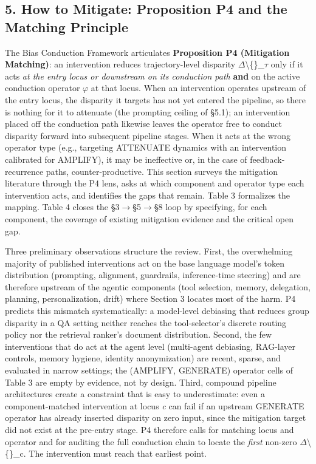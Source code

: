 \documentclass[10pt]{article}
\begin{document}
\subsection*{5. How to Mitigate: Proposition P4 and the Matching Principle}

The Bias Conduction Framework articulates \textbf{Proposition P4 (Mitigation Matching)}: an intervention reduces trajectory-level disparity $\Delta$\textbackslash\{\}\_$\tau$ only if it acts \emph{at the entry locus or downstream on its conduction path} \textbf{and} on the active conduction operator $\varphi$ at that locus. When an intervention operates upstream of the entry locus, the disparity it targets has not yet entered the pipeline, so there is nothing for it to attenuate (the prompting ceiling of \S{}5.1); an intervention placed off the conduction path likewise leaves the operator free to conduct disparity forward into subsequent pipeline stages. When it acts at the wrong operator type (e.g., targeting ATTENUATE dynamics with an intervention calibrated for AMPLIFY), it may be ineffective or, in the case of feedback-recurrence paths, counter-productive. This section surveys the mitigation literature through the P4 lens, asks at which component and operator type each intervention acts, and identifies the gaps that remain. Table 3 formalizes the mapping. Table 4 closes the \S{}3$\rightarrow$\S{}5$\rightarrow$\S{}8 loop by specifying, for each component, the coverage of existing mitigation evidence and the critical open gap.

Three preliminary observations structure the review. First, the overwhelming majority of published interventions act on the base language model's token distribution (prompting, alignment, guardrails, inference-time steering) and are therefore upstream of the agentic components (tool selection, memory, delegation, planning, personalization, drift) where Section 3 locates most of the harm. P4 predicts this mismatch systematically: a model-level debiasing that reduces group disparity in a QA setting neither reaches the tool-selector's discrete routing policy nor the retrieval ranker's document distribution. Second, the few interventions that do act at the agent level (multi-agent debiasing, RAG-layer controls, memory hygiene, identity anonymization) are recent, sparse, and evaluated in narrow settings; the (AMPLIFY, GENERATE) operator cells of Table 3 are empty by evidence, not by design. Third, compound pipeline architectures create a constraint that is easy to underestimate: even a component-matched intervention at locus \emph{c} can fail if an upstream GENERATE operator has already inserted disparity on zero input, since the mitigation target did not exist at the pre-entry stage. P4 therefore calls for matching locus and operator and for auditing the full conduction chain to locate the \emph{first} non-zero $\Delta$\textbackslash\{\}\_c. The intervention must reach that earliest point.
\end{document}
